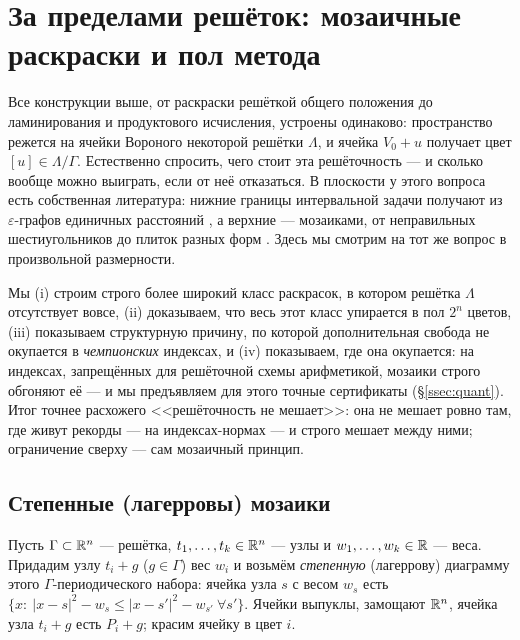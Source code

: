 \section{За пределами решёток: мозаичные раскраски и пол метода}
\label{sec:tilings}

Все конструкции выше, от раскраски решёткой общего положения до
ламинирования и продуктового исчисления, устроены одинаково: пространство
режется на ячейки Вороного некоторой решётки $\Lambda$, и ячейка
$V_0+u$ получает цвет $[u]\in\Lambda/\Gamma$. Естественно спросить, чего стоит
эта решёточность --- и сколько вообще можно выиграть, если от неё отказаться.
В плоскости у этого вопроса есть собственная литература: нижние границы
интервальной задачи получают из $\varepsilon$-графов единичных расстояний
\cite{Exoo2005,ChJW,Parts2023}, а верхние --- мозаиками, от неправильных
шестиугольников \cite{deGreyParts} до плиток разных форм \cite{Parts2023}.
Здесь мы смотрим на тот же вопрос в произвольной размерности.

Мы (i) строим строго более широкий класс раскрасок, в котором решётка
$\Lambda$ отсутствует вовсе, (ii) доказываем, что весь этот класс упирается в
пол $2^n$ цветов, (iii) показываем структурную причину, по которой
дополнительная свобода не окупается в \emph{чемпионских} индексах, и
(iv) показываем, где она окупается: на индексах, запрещённых для решёточной
схемы арифметикой, мозаики строго обгоняют её --- и мы предъявляем для этого
точные сертификаты (\S\ref{ssec:quant}). Итог точнее расхожего <<решёточность
не мешает>>: она не мешает ровно там, где живут рекорды --- на индексах-нормах
--- и строго мешает между ними; ограничение сверху --- сам мозаичный принцип.

\subsection{Степенные (лагерровы) мозаики}
\label{ssec:power}

\begin{definition}\label{def:tiling}
Пусть $\Gamma\subset\mathbb{R}^n$ --- решётка, $t_1,\dots,t_k\in\mathbb{R}^n$ --- узлы и
$w_1,\dots,w_k\in\mathbb{R}$ --- веса. Придадим узлу $t_i+g$ ($g\in\Gamma$) вес $w_i$ и
возьмём \emph{степенную} (лагеррову) диаграмму этого $\Gamma$-периодического
набора: ячейка узла $s$ с весом $w_s$ есть
$\{x:\ |x-s|^2-w_s\le|x-s'|^2-w_{s'}\ \forall s'\}$. Ячейки выпуклы, замощают
$\mathbb{R}^n$, ячейка узла $t_i+g$ есть $P_i+g$; красим ячейку в цвет $i$.
\end{definition}

